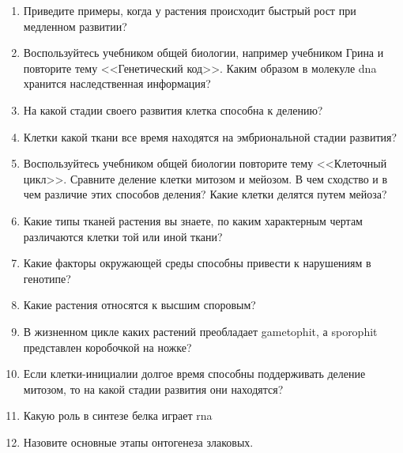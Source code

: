 \begin{enumerate}
\item Приведите примеры, когда у растения происходит \hypertarget{rapid_growth}{быстрый рост пр}и медленном развитии?
\item Воспользуйтесь учебником общей биологии, например учебником Грина \cite{green_bio} и повторите тему <<\hypertarget{question_gen_code}{Генетический код}>>. Каким образом в молекуле \gls{dna} хранится наследственная информация?
\item На какой стадии своего развития клетка способна к делению?
\item Клетки какой ткани все время находятся на эмбриональной стадии развития?
\item Воспользуйтесь учебником общей биологии повторите тему <<Клеточный цикл>>. Сравните деление клетки \hypertarget{question_mitosis}{митозом} и мейозом. В чем сходство и в чем различие этих способов деления? Какие клетки делятся путем мейоза?
\item Какие типы \hypertarget{plants_tisues}{тканей} растения вы знаете, по каким характерным чертам различаются клетки той или иной ткани?
\item Какие факторы окружающей среды способны привести к нарушениям в генотипе?
\item Какие растения относятся к высшим споровым?
\item В жизненном цикле каких растений преобладает \gls{gametophit}, а \gls{sporophit} представлен коробочкой на ножке?
\item Если клетки-инициалии долгое время способны поддерживать деление митозом, то на какой стадии развития они находятся?
\item Какую роль в \hypertarget{proteinSintez}{синтезе} белка играет \gls{rna}
\item Назовите основные этапы онтогенеза злаковых.
\end{enumerate}
